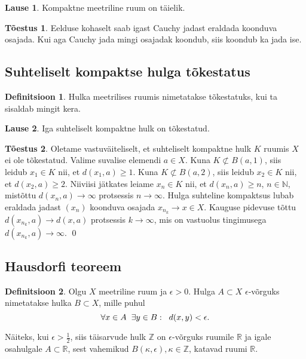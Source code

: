 \documentclass{article}[12pt]
\newcommand{\h}{\hspace{0.2cm}}
\newcommand{\R}{\mathbb{R}}
\newcommand{\N}{\mathbb{N}}
\newcommand{\Z}{\mathbb{Z}}
\theoremstyle{definition}
\newtheorem{definition}{Definitsioon}[section]
\theoremstyle{definition}
\theoremstyle{definition}
\newtheorem{lause}{Lause}[section]
\theoremstyle{break}
\newtheorem*{toestus}{Tõestus}
\begin{document}
\begin{lause}
	Kompaktne meetriline ruum on täielik.
\end{lause}

\begin{toestus}
	Eelduse kohaselt saab igast Cauchy jadast eraldada koonduva osajada.
	Kui aga Cauchy jada mingi osajadak koondub, siis koondub ka jada ise.
\end{toestus}

\subsection{Suhteliselt kompaktse hulga tõkestatus}

\begin{definition}
	Hulka meetrilises ruumis nimetatakse tõkestatuks, kui ta sisaldab mingit kera.
\end{definition}

\begin{lause}
	Iga suhteliselt kompaktne hulk on tõkestatud.
\end{lause}

\begin{toestus}
	Oletame vastuväiteliselt, et suhteliselt kompaktne hulk $K$ ruumis $X$ ei ole tõkestatud. 
	Valime suvalise elemendi $a\in X$. Kuna $K\not\subset B(a,1)$, siis leidub $x_1\in K$ nii, et $d(x_1,a)\geq 1$. 
	Kuna $K\not\subset B(a,2)$, siis leidub $x_2\in K$ nii, et $d(x_2,a)\geq 2$. 
	Niiviisi jätkates leiame $x_n\in K$ nii, et $d(x_n,a)\geq n$, $n\in\N$, mistõttu $d(x_n,a)\rightarrow \infty$ protsessis $n\rightarrow \infty$. 
	Hulga suhteline kompaktsus lubab eraldada jadast $(x_n)$ koonduva osajada $x_{n_k}\rightarrow x\in X$. 
	Kauguse pidevuse tõttu $d(x_{n_k}, a)\rightarrow d(x,a)$ protsessis $k\rightarrow \infty$, mis on vastuolus tingimusega $d(x_{n_k},a)\rightarrow\infty$.
	\qed
\end{toestus}

\subsection{Hausdorfi teoreem}

\begin{definition}
	Olgu $X$ meetriline ruum ja $\epsilon>0$.
	Hulga $A\subset X$ $\epsilon$-võrguks nimetatakse hulka $B\subset X$, mille puhul
	\[
		\forall x\in A\h\exists y\in B:\h d(x,y)<\epsilon.
	\]
\end{definition}

Näiteks, kui $\epsilon > \frac{1}{2}$, siis täisarvude hulk $\Z$ on $\epsilon$-võrguks ruumile $\R$ ja igale osahulgale $A\subset \R$, sest vahemikud $B(\kappa,\epsilon),\kappa\in\Z$, katavad ruumi $\R$.
\end{document}
